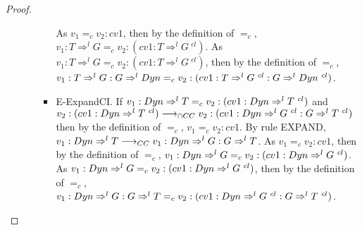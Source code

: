 \documentclass[a4paper]{article}
\begin{document}
\begin{proof}
\begin{itemize}
\begin{itemize}
\begin{itemize}
            As $v_1 =_c v_2 : cv1$, then by the definition of $=_c$, $v_1 : T \Rightarrow^l G =_c v_2 : (cv1 : T \Rightarrow^l G\ ^{cl})$.
            As $v_1 : T \Rightarrow^l G =_c v_2 : (cv1 : T \Rightarrow^l G\ ^{cl})$, then by the definition of $=_c$, $v_1 : T \Rightarrow^l G : G \Rightarrow^l \Dyn =_c v_2 : (cv1 : T \Rightarrow^l G\ ^{cl} : G \Rightarrow^l \Dyn\ ^{cl})$.
            \item E-ExpandCI.
            If $v_1 : Dyn \Rightarrow^l T =_c v_2 : (cv1 : Dyn \Rightarrow^l T\ ^{cl})$ and $v_2 : (cv1 : \Dyn \Rightarrow^l T\ ^{cl}) \gios v_2 : (cv1 : \Dyn \Rightarrow^l G\ ^{cl} : G \Rightarrow^l T\ ^{cl})$ then by the definition of $=_c$, $v_1 =_c v_2 : cv1$.
            By rule EXPAND, $v_1 : Dyn \Rightarrow^l T \longrightarrow_{CC} v_1 : Dyn \Rightarrow^l G : G \Rightarrow^l T$.
            As $v_1 =_c v_2 : cv1$, then by the definition of $=_c$, $v_1 : \Dyn \Rightarrow^l G =_c v_2 : (cv1 : \Dyn \Rightarrow^l G\ ^{cl})$.
            As $v_1 : \Dyn \Rightarrow^l G =_c v_2 : (cv1 : \Dyn \Rightarrow^l G\ ^{cl})$, then by the definition of $=_c$, $v_1 : \Dyn \Rightarrow^l G : G \Rightarrow^l T =_c v_2 : (cv1 : \Dyn \Rightarrow^l G\ ^{cl} : G \Rightarrow^l T\ ^{cl})$.
        \end{itemize}
    \end{itemize}
\end{itemize}
\end{proof}
\end{document}
